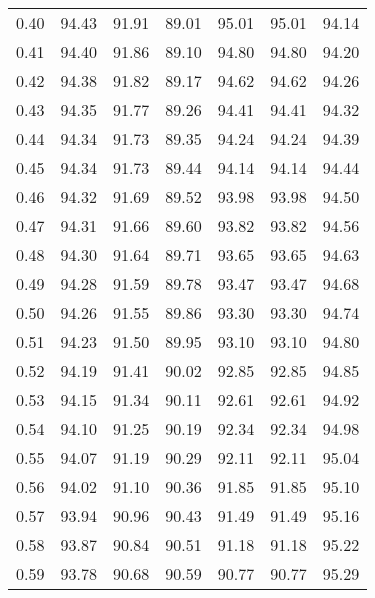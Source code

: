 \begin{tabular}{|c|c|c|c|c|c|c|}
      0.40 &     94.43 &     91.91 &      89.01 &   95.01 &      95.01 &         94.14 \\
      0.41 &     94.40 &     91.86 &      89.10 &   94.80 &      94.80 &         94.20 \\
      0.42 &     94.38 &     91.82 &      89.17 &   94.62 &      94.62 &         94.26 \\
      0.43 &     94.35 &     91.77 &      89.26 &   94.41 &      94.41 &         94.32 \\
      0.44 &     94.34 &     91.73 &      89.35 &   94.24 &      94.24 &         94.39 \\
      0.45 &     94.34 &     91.73 &      89.44 &   94.14 &      94.14 &         94.44 \\
      0.46 &     94.32 &     91.69 &      89.52 &   93.98 &      93.98 &         94.50 \\
      0.47 &     94.31 &     91.66 &      89.60 &   93.82 &      93.82 &         94.56 \\
      0.48 &     94.30 &     91.64 &      89.71 &   93.65 &      93.65 &         94.63 \\
      0.49 &     94.28 &     91.59 &      89.78 &   93.47 &      93.47 &         94.68 \\
      0.50 &     94.26 &     91.55 &      89.86 &   93.30 &      93.30 &         94.74 \\
      0.51 &     94.23 &     91.50 &      89.95 &   93.10 &      93.10 &         94.80 \\
      0.52 &     94.19 &     91.41 &      90.02 &   92.85 &      92.85 &         94.85 \\
      0.53 &     94.15 &     91.34 &      90.11 &   92.61 &      92.61 &         94.92 \\
      0.54 &     94.10 &     91.25 &      90.19 &   92.34 &      92.34 &         94.98 \\
      0.55 &     94.07 &     91.19 &      90.29 &   92.11 &      92.11 &         95.04 \\
      0.56 &     94.02 &     91.10 &      90.36 &   91.85 &      91.85 &         95.10 \\
      0.57 &     93.94 &     90.96 &      90.43 &   91.49 &      91.49 &         95.16 \\
      0.58 &     93.87 &     90.84 &      90.51 &   91.18 &      91.18 &         95.22 \\
      0.59 &     93.78 &     90.68 &      90.59 &   90.77 &      90.77 &         95.29 \\

\end{tabular}
